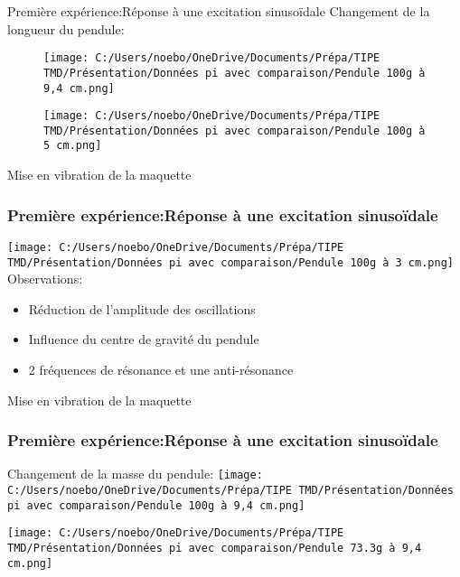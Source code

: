 \documentclass{beamer}
\begin{document}
	
	\begin{frame}{Première expérience:Réponse à une excitation sinusoïdale}
	Changement de la longueur du pendule:

		
		\begin{figure}
		\centering
		\texttt{[image: C:/Users/noebo/OneDrive/Documents/Prépa/TIPE TMD/Présentation/Données pi avec comparaison/Pendule 100g à 9,4 cm.png]}
		
		
		\centering
		\texttt{[image: C:/Users/noebo/OneDrive/Documents/Prépa/TIPE TMD/Présentation/Données pi avec comparaison/Pendule 100g à 5 cm.png]}
		\end{figure}
	\end{frame}
	
	\begin{frame}{Mise en vibration de la maquette}
		\frametitle{Première expérience:Réponse à une excitation sinusoïdale}
		\centering
		\texttt{[image: C:/Users/noebo/OneDrive/Documents/Prépa/TIPE TMD/Présentation/Données pi avec comparaison/Pendule 100g à 3 cm.png]}
		\\
		\vspace{12pt}
		Observations:
		\begin{itemize}
			\item Réduction de l'amplitude des oscillations
			\item Influence du centre de gravité du pendule
			\item 2 fréquences de résonance et une anti-résonance   
		\end{itemize}
		
	\end{frame}


	
	\begin{frame}{Mise en vibration de la maquette}
		\frametitle{Première expérience:Réponse à une excitation sinusoïdale}	
		Changement de la masse du pendule:
		\centering
		\texttt{[image: C:/Users/noebo/OneDrive/Documents/Prépa/TIPE TMD/Présentation/Données pi avec comparaison/Pendule 100g à 9,4 cm.png]}
		
		
		\centering
		\texttt{[image: C:/Users/noebo/OneDrive/Documents/Prépa/TIPE TMD/Présentation/Données pi avec comparaison/Pendule 73.3g à 9,4 cm.png]}
		
		
	\end{frame}
	
	
	
\end{document}
